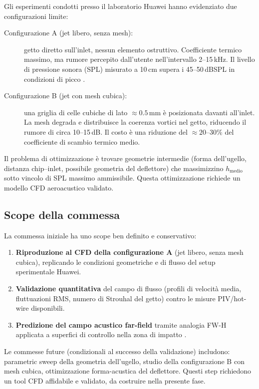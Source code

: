\documentclass[11pt,a4paper]{article}
\begin{document}
Gli esperimenti condotti presso il laboratorio Huawei hanno evidenziato due configurazioni limite:

\begin{description}
  \item[Configurazione A (jet libero, senza mesh):] getto diretto sull'inlet, nessun elemento ostruttivo. Coefficiente termico massimo, ma rumore percepito dall'utente nell'intervallo 2--15\,kHz. Il livello di pressione sonora (SPL) misurato a 10\,cm supera i 45--50\,dBSPL in condizioni di picco \cite{Viswanathan2004}.

  \item[Configurazione B (jet con mesh cubica):] una griglia di celle cubiche di lato $\approx 0.5$\,mm è posizionata davanti all'inlet. La mesh degrada e distribuisce la coerenza vortici nel getto, riducendo il rumore di circa 10--15\,dB. Il costo è una riduzione del $\approx 20$--30\% del coefficiente di scambio termico medio.
\end{description}

Il problema di ottimizzazione è trovare geometrie intermedie (forma dell'ugello, distanza chip--inlet, possibile geometria del deflettore) che massimizzino $h_{\mathrm{medio}}$ sotto vincolo di SPL massimo ammissibile. Questa ottimizzazione richiede un modello CFD aeroacustico validato.

\subsection{Scope della commessa}

La commessa iniziale ha uno scope ben definito e conservativo:

\begin{enumerate}
  \item \textbf{Riproduzione al CFD della configurazione A} (jet libero, senza mesh cubica), replicando le condizioni geometriche e di flusso del setup sperimentale Huawei.
  \item \textbf{Validazione quantitativa} del campo di flusso (profili di velocità media, fluttuazioni RMS, numero di Strouhal del getto) contro le misure PIV/hot-wire disponibili.
  \item \textbf{Predizione del campo acustico far-field} tramite analogia FW-H applicata a superfici di controllo nella zona di impatto \cite{Shur2005}.
\end{enumerate}

Le commesse future (condizionali al successo della validazione) includono: parametric sweep della geometria dell'ugello, studio della configurazione B con mesh cubica, ottimizzazione forma-acustica del deflettore. Questi step richiedono un tool CFD affidabile e validato, da costruire nella presente fase.
\end{document}
